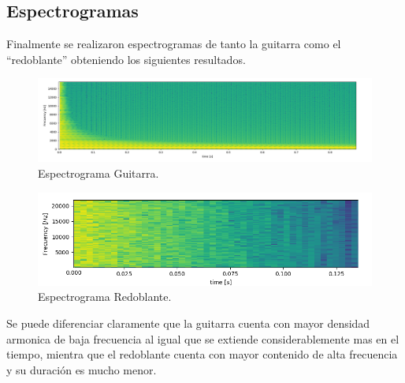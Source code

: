 \subsection{Espectrogramas}
Finalmente se realizaron espectrogramas de tanto la guitarra como el ``redoblante'' obteniendo los siguientes resultados.
\begin{figure}[H]
	\centering
	\includegraphics[width=1\textwidth]{ImagenesEjercicio4/espectroGuitar.PNG}
\caption{Espectrograma Guitarra.}
	\label{fig:especGuitar}
\end{figure}
\begin{figure}[H]
	\centering
	\includegraphics[width=1\textwidth]{ImagenesEjercicio4/espectroDrum.PNG}
\caption{Espectrograma Redoblante.}
	\label{fig:especdrum}
\end{figure}
Se puede diferenciar claramente que la guitarra cuenta con mayor densidad armonica de baja frecuencia al igual que se extiende considerablemente mas en el tiempo, mientra que el redoblante cuenta con mayor contenido de alta frecuencia y su duración es mucho menor.
